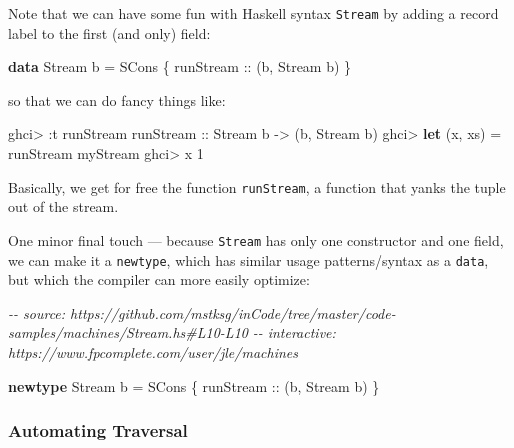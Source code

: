 \documentclass[]{article}
\newenvironment{Shaded}{}{}
\newcommand{\CommentTok}[1]{\textcolor[rgb]{0.38,0.63,0.69}{\textit{#1}}}
\newcommand{\DataTypeTok}[1]{\textcolor[rgb]{0.56,0.13,0.00}{#1}}
\newcommand{\DecValTok}[1]{\textcolor[rgb]{0.25,0.63,0.44}{#1}}
\newcommand{\KeywordTok}[1]{\textcolor[rgb]{0.00,0.44,0.13}{\textbf{#1}}}
\newcommand{\NormalTok}[1]{#1}
\newcommand{\OperatorTok}[1]{\textcolor[rgb]{0.40,0.40,0.40}{#1}}
\newcommand{\OtherTok}[1]{\textcolor[rgb]{0.00,0.44,0.13}{#1}}
\begin{document}
Note that we can have some fun with Haskell syntax \texttt{Stream} by adding a
record label to the first (and only) field:

\begin{Shaded}
\begin{Highlighting}[]
\KeywordTok{data} \DataTypeTok{Stream}\NormalTok{ b }\OtherTok{=} \DataTypeTok{SCons}\NormalTok{ \{}\OtherTok{ runStream ::}\NormalTok{ (b, }\DataTypeTok{Stream}\NormalTok{ b) \}}
\end{Highlighting}
\end{Shaded}

so that we can do fancy things like:

\begin{Shaded}
\begin{Highlighting}[]
\NormalTok{ghci}\OperatorTok{\textgreater{}} \OperatorTok{:}\NormalTok{t runStream}
\OtherTok{runStream ::} \DataTypeTok{Stream}\NormalTok{ b }\OtherTok{{-}\textgreater{}}\NormalTok{ (b, }\DataTypeTok{Stream}\NormalTok{ b)}
\NormalTok{ghci}\OperatorTok{\textgreater{}} \KeywordTok{let}\NormalTok{ (x, xs) }\OtherTok{=}\NormalTok{ runStream myStream}
\NormalTok{ghci}\OperatorTok{\textgreater{}}\NormalTok{ x}
\DecValTok{1}
\end{Highlighting}
\end{Shaded}

Basically, we get for free the function \texttt{runStream}, a function that
yanks the tuple out of the stream.

One minor final touch --- because \texttt{Stream} has only one constructor and
one field, we can make it a \texttt{newtype}, which has similar usage
patterns/syntax as a \texttt{data}, but which the compiler can more easily
optimize:

\begin{Shaded}
\begin{Highlighting}[]
\CommentTok{{-}{-} source: https://github.com/mstksg/inCode/tree/master/code{-}samples/machines/Stream.hs\#L10{-}L10}
\CommentTok{{-}{-} interactive: https://www.fpcomplete.com/user/jle/machines}

\KeywordTok{newtype} \DataTypeTok{Stream}\NormalTok{ b }\OtherTok{=} \DataTypeTok{SCons}\NormalTok{ \{}\OtherTok{ runStream ::}\NormalTok{ (b, }\DataTypeTok{Stream}\NormalTok{ b) \}}
\end{Highlighting}
\end{Shaded}

\subsubsection{Automating Traversal}\label{automating-traversal}
\end{document}
